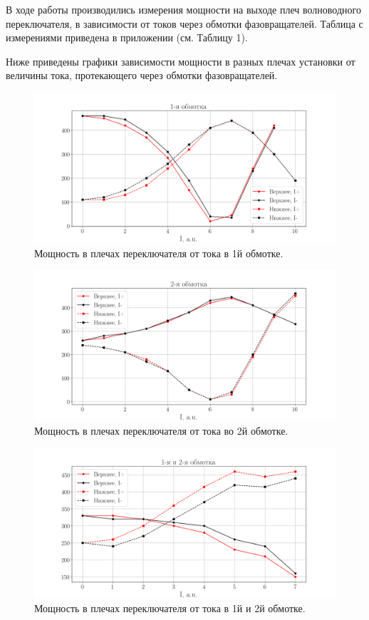 В ходе работы производились измерения мощности на выходе плеч волноводного переключателя, в зависимости от
токов через обмотки фазовращателей. Таблица с измерениями приведена в приложении (см. Таблицу 1).

Ниже приведены графики зависимости мощности в разных плечах установки от величины тока, протекающего через обмотки фазовращателей.
\begin{figure}[H]
    \centering
    \includegraphics[width = 0.9\linewidth]{imgs/graphs/phaser1.png}
    \caption{Мощность в плечах переключателя от тока в 1й обмотке.}
    \label{fig:exp:phaser1}
\end{figure}
\begin{figure}[H]
    \centering
    \includegraphics[width = 0.9\linewidth]{imgs/graphs/phaser2.png}
    \caption{Мощность в плечах переключателя от тока во 2й обмотке.}
    \label{fig:exp:phaser2}
\end{figure}
\begin{figure}[H]
    \centering
    \includegraphics[width = 0.9\linewidth]{imgs/graphs/phaser3.png}
    \caption{Мощность в плечах переключателя от тока в 1й и 2й обмотке.}
    \label{fig:exp:phaser3}
\end{figure}


